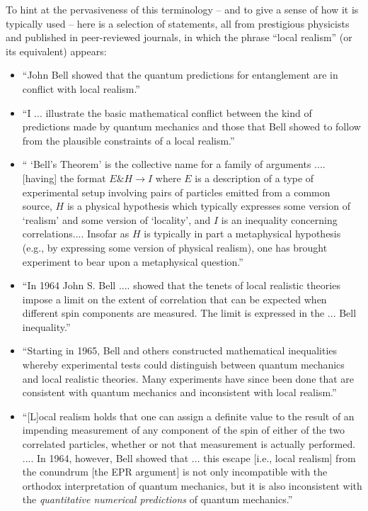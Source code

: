 \documentclass[12pt]{article}
\begin{document}
To hint at the pervasiveness of this terminology -- and to give a
sense of how it is typically used -- here is a selection of 
statements, all from prestigious physicists
and published in peer-reviewed journals, in which the
phrase ``local realism'' (or its equivalent) appears:

\begin{itemize}

\item  ``John Bell showed that the quantum
  predictions for entanglement are in conflict with local realism.''
  \cite{zeilinger} 

\item  ``I ... illustrate the basic mathematical
conflict between the kind of predictions made by quantum mechanics and
those that Bell showed to follow from the plausible constraints of a
local realism.''  \cite{price}

\item `` `Bell's Theorem'
is the collective name for a family of arguments .... [having] the
format $E \& H \rightarrow I$ where $E$ is a description of a type of
experimental setup involving pairs of particles emitted from a common
source, $H$ is a physical hypothesis which typically expresses some
version of `realism' and some version of `locality', and $I$ is an
inequality concerning correlations....
Insofar as $H$ is typically in part a metaphysical hypothesis 
(e.g., by expressing some version of physical realism), one has 
brought experiment to bear upon a metaphysical
question.'' \cite{shimony}

\item  ``In 1964 John S. Bell .... showed
  that the tenets of local realistic theories impose a limit on the
  extent of correlation that can be expected when different spin
  components are measured. The limit is expressed in the ... Bell
  inequality.''  \cite{despagnat}

\item ``Starting in 1965, Bell and others
  constructed mathematical inequalities whereby experimental tests
  could distinguish between quantum mechanics and local realistic
  theories.  Many experiments have since been done that are consistent
  with quantum mechanics and inconsistent with local realism.'' \cite{rowe}

\item ``[L]ocal realism holds that one can
  assign a definite value to the result of an impending measurement of
  any component of the spin of either of the two correlated particles,
  whether or not that measurement is actually performed.  ....  In
  1964, however, Bell showed that ... this escape [i.e., local
  realism] from the conundrum [the EPR argument]
  is not only incompatible with the
  orthodox interpretation of quantum mechanics, but it is also
  inconsistent with the \emph{quantitative numerical predictions} of
  quantum mechanics.'' \cite{mermin1980}


\end{itemize}
\end{document}
